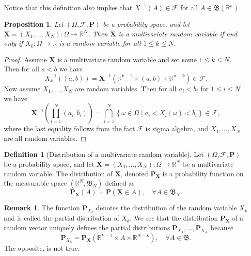 \documentclass[11pt,a4paper]{article}
\theoremstyle{definition}
\newtheorem{definition}{Definition}[section]
\newtheorem{remark}{Remark}[section]
\theoremstyle{plain}
\newtheorem{proposition}[theorem]{Proposition}
\newcommand{\R}{\mathbb{R}}
\newcommand{\Prob}{\mathbf{P}}
\newcommand{\set}[2]{ \left\{ #1 \mid #2 \right\} }
\renewcommand{\vec}[1]{\boldsymbol{\mathbf{#1}}}
\begin{document}
  Notice that this definition also implies that $X^{-1}(A) \in \mathcal F$
  for all $A \in \mathfrak B\left(\R^n\right)$.

  \begin{proposition}
    Let $(\Omega, \mathcal F, \Prob)$ be a probability space, 
    and let $\vec{X} = (X_1,\dots,X_N) \colon \Omega \to \R^N$. 
    Then $\vec{X}$ is a multivariate random variable if and only if 
    $X_k \colon \Omega \to \R$ is a random variable for all $1 \le k \le N$.
  \end{proposition}
  \begin{proof}
    Assume $\vec{X}$ is a multivariate random variable and set some $1 \le k \le N$.
    Then for all $a < b$ we have
    \[
      X_k^{-1}((a,b)) = 
      \vec{X}^{-1}\left(\R^{k-1} \times (a,b) \times \R^{n-k}\right) \in
      \mathcal F.
    \]
    Now assume $X_1,\dots,X_N$ are random variables. Then for all $a_i < b_i$
    for $1 \le i \le N$ we have
    \[
      \vec{X}^{-1}\left(\prod_{i=1}^{N} (a_i, b_i)\right) =
      \bigcap_{i=1}^{N}\set{\omega \in \Omega}{a_i < X_i(\omega) < b_i} \in
      \mathcal F,
    \]
    where the last equality follows from the fact $\mathcal F$ is  sigma
    algebra, and $X_1,\dots,X_N$ are all random variables.
  \end{proof}

  \begin{definition}[Distribution of a multivariate random variable]
    Let $(\Omega, \mathcal F, \Prob)$ be a probability space, 
    and let $\vec{X} = (X_1,\dots,X_N) \colon \Omega \to \R^N$ be a multivariate
    random variable.
    The distribution of $\vec{X}$, denoted $\Prob_{\vec{X}}$ is a probability function
    on the measurable space $(\R^N, \mathfrak B_N)$ defined as
    \[
      \Prob_{\vec{X}}(A) =
      \Prob(\vec{X} \in A), \quad
      \forall A \in \mathfrak  B_N.
    \]
  \end{definition}

  \begin{remark}
    The function $\Prob_{X_k}$ denotes the distribution of the random
    variable $X_k$ and is called the partial distribution of $X_k$.
    We see that the distribution $\Prob_{\vec{X}}$ of a random vector uniquely
    defines the partial distributions $\Prob_{X_1},\dots,\Prob_{X_N}$
    because
    \[
      \Prob_{X_k} =
      \Prob_{\vec{X}}\left(\R^{k-1} \times A \times \R^{N-k}\right),
      \quad \forall A \in \mathfrak B.
    \]
    The opposite, is not true.
  \end{remark}
\end{document}
